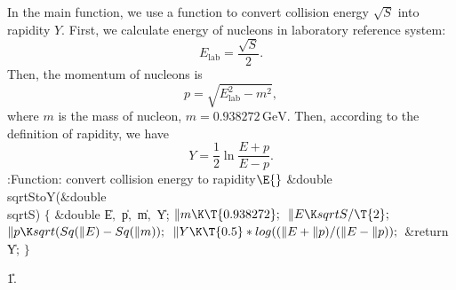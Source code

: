 \documentclass{cweb}
\begin{document}
In the main function, we use a function to convert collision energy $%
\sqrt{S}$ into rapidity $Y$. First, we calculate energy of nucleons in
laboratory reference system:
\begin{equation}
E_{\text{lab}} = \frac{\sqrt{S}}{2}.
\end{equation}
Then, the momentum of nucleons is
\begin{equation}
p = \sqrt{E_{\text{lab}}^2 - m^2},
\end{equation}
where $m$ is the mass of nucleon, $m = 0.938272 \,\mathrm{GeV}$. Then,
according to the definition of rapidity, we have
\begin{equation}
Y = \frac{1}{2} \ln\frac{E+p}{E-p}.
\end{equation}
\Y\B\4:Function: convert collision energy to rapidity\X${}\E{}$\6
\&{double} \\{sqrtStoY}(\&{double} \\{sqrtS})\1\1\2\2\6
${}\{{}$\1\6
\&{double} \|E${},{}$ \|p${},{}$ \|m${},{}$ \|Y;\7
${}\|m\K\T{0.938272};{}$\6
${}\|E\K\\{sqrtS}/\T{2};{}$\6
${}\|p\K\\{sqrt}(\\{Sq}(\|E)-\\{Sq}(\|m));{}$\6
${}\|Y\K\T{0.5}*\\{log}((\|E+\|p)/(\|E-\|p));{}$\6
\&{return} \|Y;\6
\4${}\}{}$\2\par
\U1.\fi
\end{document}
